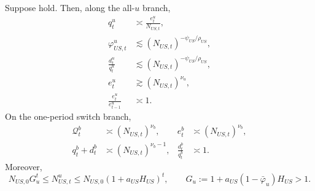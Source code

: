 \documentclass{article}
\begin{document}
\begin{lem}\label{lem_prod_orders}
Suppose  hold. Then, along the all-$u$ branch,
\begin{align}
q_t^u &\asymp \frac{e_t^u}{N_{US,t}},
\label{q_u_e_over_N}\\
\varphi_{US,t}^u &\lesssim (N_{US,t})^{-\psi_{US}/\rho_{US}},
\label{phi_u_upper_order}\\
\frac{d_t^u}{q_t^u} &\lesssim (N_{US,t})^{-\psi_{US}/\rho_{US}},
\label{dq_u_upper_order}\\
e_t^u &\gtrsim (N_{US,t})^{\nu_u},
\label{e_u_lower_order}\\
\frac{e_t^u}{e_{t-1}^u}&\asymp 1.
\label{e_u_growth_order}
\end{align}
On the one-period switch branch,
\begin{align}
\mathcal Q_t^b &\asymp (N_{US,t})^{\nu_b},
&
e_t^b &\asymp (N_{US,t})^{\nu_b},
\label{Qe_b_orders_prod}\\
q_t^b+d_t^b &\asymp (N_{US,t})^{\nu_b-1},
&
\frac{d_t^b}{q_t^b}&\asymp 1.
\label{qd_b_orders_prod}
\end{align}
Moreover,
\begin{equation}\label{Nu_geometric_growth}
N_{US,0}G_u^t
\le
N_{US,t}^u
\le
N_{US,0}(1+a_{US}H_{US})^t,
\qquad
G_u:=1+a_{US}(1-\bar\varphi_u)H_{US}>1.
\end{equation}
\end{lem}
\end{document}
